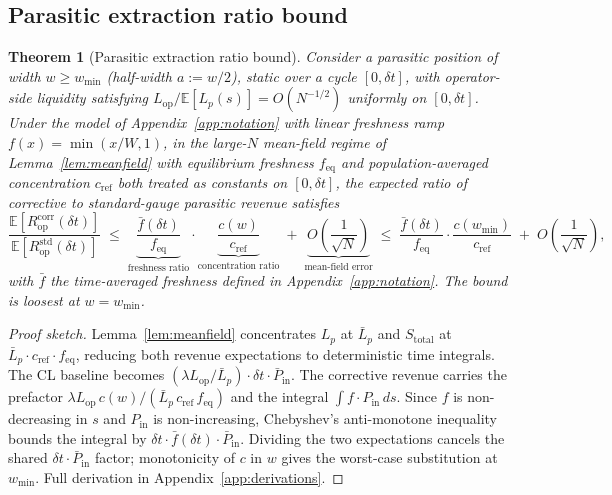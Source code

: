 \documentclass[11pt,a4paper]{article}
\theoremstyle{definition}
\theoremstyle{plain}
\newtheorem{theorem}{Theorem}
\theoremstyle{remark}
\begin{document}
\subsection{Parasitic extraction ratio bound}\label{sec:parasitic-thm}

\begin{theorem}[Parasitic extraction ratio bound]\label{thm:parasitic}
Consider a parasitic position of width $w \geq w_{\min}$ (half-width $a := w/2$), static over a cycle $[0, \delta t]$, with operator-side liquidity satisfying $L_{\text{op}}/\mathbb{E}[L_p(s)] = O(N^{-1/2})$ uniformly on $[0, \delta t]$. Under the model of Appendix~\ref{app:notation} with linear freshness ramp $f(x) = \min(x/W, 1)$, in the large-$N$ mean-field regime of Lemma~\ref{lem:meanfield} with equilibrium freshness $f_{\text{eq}}$ and population-averaged concentration $c_{\text{ref}}$ both treated as constants on $[0, \delta t]$, the expected ratio of corrective to standard-gauge parasitic revenue satisfies
\begin{equation}\label{eq:thm1}
\frac{\mathbb{E}[R^{\text{corr}}_{\text{op}}(\delta t)]}{\mathbb{E}[R^{\text{std}}_{\text{op}}(\delta t)]} \;\leq\; \underbrace{\frac{\bar f(\delta t)}{f_{\text{eq}}}}_{\text{freshness ratio}} \cdot \underbrace{\frac{c(w)}{c_{\text{ref}}}}_{\text{concentration ratio}} \;+\; \underbrace{O\!\left(\frac{1}{\sqrt{N}}\right)}_{\text{mean-field error}} \;\leq\; \frac{\bar f(\delta t)}{f_{\text{eq}}} \cdot \frac{c(w_{\min})}{c_{\text{ref}}} \;+\; O\!\left(\frac{1}{\sqrt{N}}\right),
\end{equation}
with $\bar f$ the time-averaged freshness defined in Appendix~\ref{app:notation}. The bound is loosest at $w = w_{\min}$.
\end{theorem}

\begin{proof}[Proof sketch]
Lemma~\ref{lem:meanfield} concentrates $L_p$ at $\bar L_p$ and $S_{\text{total}}$ at $\bar L_p \cdot c_{\text{ref}} \cdot f_{\text{eq}}$, reducing both revenue expectations to deterministic time integrals. The CL baseline becomes $(\lambda L_{\text{op}}/\bar L_p) \cdot \delta t \cdot \bar P_{\text{in}}$. The corrective revenue carries the prefactor $\lambda L_{\text{op}}\,c(w)/(\bar L_p\,c_{\text{ref}}\,f_{\text{eq}})$ and the integral $\int f \cdot P_{\text{in}}\,ds$. Since $f$ is non-decreasing in $s$ and $P_{\text{in}}$ is non-increasing, Chebyshev's anti-monotone inequality bounds the integral by $\delta t \cdot \bar f(\delta t) \cdot \bar P_{\text{in}}$. Dividing the two expectations cancels the shared $\delta t \cdot \bar P_{\text{in}}$ factor; monotonicity of $c$ in $w$ gives the worst-case substitution at $w_{\min}$. Full derivation in Appendix~\ref{app:derivations}.
\end{proof}
\end{document}
